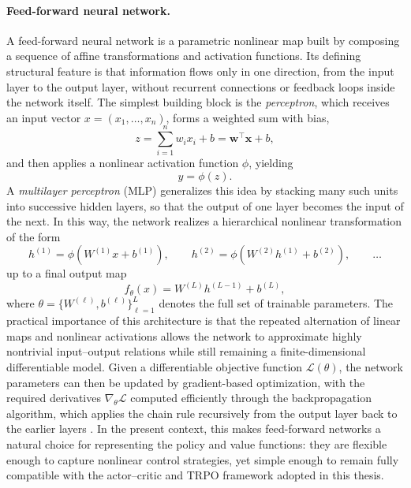 \paragraph{Feed-forward neural network.}
A feed-forward neural network is a parametric nonlinear map built by composing a sequence of affine transformations and activation functions. Its defining structural feature is that information flows only in one direction, from the input layer to the output layer, without recurrent connections or feedback loops inside the network itself. The simplest building block is the \emph{perceptron}, which receives an input vector \(x=(x_1,\dots,x_n)\), forms a weighted sum with bias,
\begin{equation}
z = \sum_{i=1}^{n} w_i x_i + b = \bm{w}^{\top}\bm{x}+b,
\label{eq:perceptron_affine_map}
\end{equation}
and then applies a nonlinear activation function \(\phi\), yielding
\begin{equation}
y = \phi(z).
\label{eq:perceptron_output}
\end{equation}
A \emph{multilayer perceptron} (MLP) generalizes this idea by stacking many such units into successive hidden layers, so that the output of one layer becomes the input of the next. In this way, the network realizes a hierarchical nonlinear transformation of the form
\begin{equation}
h^{(1)} = \phi\!\left(W^{(1)}x+b^{(1)}\right), \qquad
h^{(2)} = \phi\!\left(W^{(2)}h^{(1)}+b^{(2)}\right), \qquad \dots
\label{eq:mlp_hidden_layers}
\end{equation}
up to a final output map
\begin{equation}
f_{\theta}(x)=W^{(L)}h^{(L-1)}+b^{(L)},
\label{eq:mlp_output_map}
\end{equation}
where \(\theta=\{W^{(\ell)},b^{(\ell)}\}_{\ell=1}^{L}\) denotes the full set of trainable parameters. The practical importance of this architecture is that the repeated alternation of linear maps and nonlinear activations allows the network to approximate highly nontrivial input--output relations while still remaining a finite-dimensional differentiable model. 
Given a differentiable objective function \(\mathcal{L}(\theta)\), the network parameters can then be updated by gradient-based optimization, with the required derivatives \(\nabla_{\theta}\mathcal{L}\) computed efficiently through the backpropagation algorithm, which applies the chain rule recursively from the output layer back to the earlier layers \cite{Rumelhart1986,Goodfellow2016}.
In the present context, this makes feed-forward networks a natural choice for representing the policy and value functions: they are flexible enough to capture nonlinear control strategies, yet simple enough to remain fully compatible with the actor--critic and TRPO framework adopted in this thesis.

